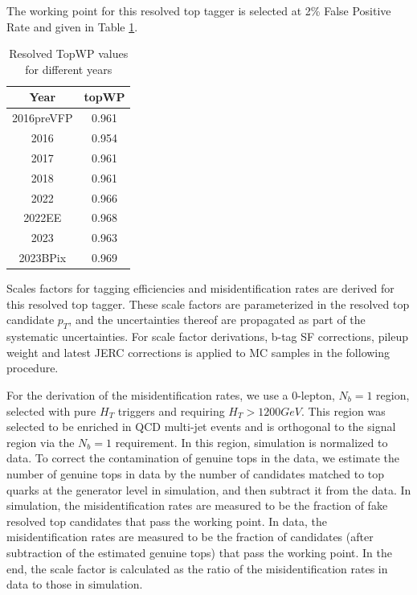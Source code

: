 \documentclass[twoside]{article}
\begin{document}
The working point for this resolved top tagger is selected at 2\% False Positive Rate and given in Table \ref{tab:topWP}.


\begin{table}[h]
\centering
\begin{tabular}{|c|c|}
\hline
\textbf{Year} & \textbf{topWP} \\ 
\hline
2016preVFP  & 0.961  \\
2016     & 0.954  \\
2017     & 0.961  \\
2018     & 0.961  \\
2022     & 0.966 \\
2022EE   & 0.968  \\
2023     & 0.963  \\
2023BPix & 0.969 \\
\hline
\end{tabular}
\caption{Resolved TopWP values for different years}
\label{tab:topWP}
\end{table}

Scales factors for tagging efficiencies and misidentification rates are derived for this resolved top tagger. These scale factors are parameterized in the resolved top candidate $p_{T}$, and the uncertainties thereof are propagated as part of the systematic uncertainties. For scale factor derivations, b-tag SF corrections, pileup weight and latest JERC corrections is applied to MC samples in the following procedure.

For the derivation of the misidentification rates, we use a 0-lepton, $N_{b}=1$ region, selected with pure $H_{T}$ triggers and requiring $H_{T}>1200 GeV$. This region was selected to be enriched in QCD multi-jet events and is orthogonal to the signal region via the $N_{b}=1$ requirement. In this region, simulation is normalized to data. To correct the contamination of genuine tops in the data, we estimate the number of genuine tops in data by the number of candidates matched to top quarks at the generator level in simulation, and then subtract it from the data. In simulation, the misidentification rates are measured to be the fraction of fake resolved top candidates that pass the working point. In data, the misidentification rates are measured to be the fraction of candidates (after subtraction of the estimated genuine tops) that pass the working point. In the end, the scale factor is calculated as the ratio of the misidentification rates in data to those in simulation.
\end{document}
